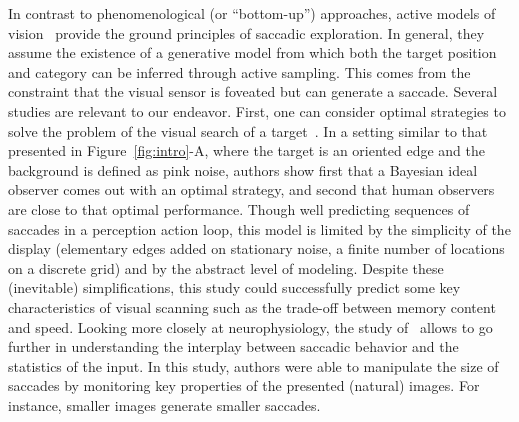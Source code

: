 In contrast to phenomenological (or ``bottom-up'') approaches, active models of vision~\cite{Najemnik05,Butko2010infomax,Friston12} provide the ground principles of saccadic exploration. In general, they assume the existence of a generative model from which both the target position and category can be inferred through active sampling. This comes from the constraint that the visual sensor is foveated but can generate a saccade.
Several studies are relevant to our endeavor. First, one can consider optimal strategies to solve the problem of the visual search of a target~\cite{Najemnik05}. In a setting similar to that presented in Figure~\ref{fig:intro}-A, where the target is an oriented edge and the background is defined as pink noise, authors show first that a Bayesian ideal observer comes out with an optimal strategy, and second that human observers are close to that optimal performance. Though well predicting sequences of saccades in a perception action loop, this model is limited by the simplicity of the display (elementary edges added on stationary noise, a finite number of locations on a discrete grid) and by the abstract level of modeling. Despite these (inevitable) simplifications, this study could successfully predict some key characteristics of visual scanning such as the trade-off between memory content and speed. Looking more closely at neurophysiology, the study of~\cite{Samonds18} allows to go further in understanding the interplay between saccadic behavior and the statistics of the input. In this study, authors were able to manipulate the size of saccades by monitoring key properties of the presented (natural) images. For instance, smaller images generate smaller saccades. %

